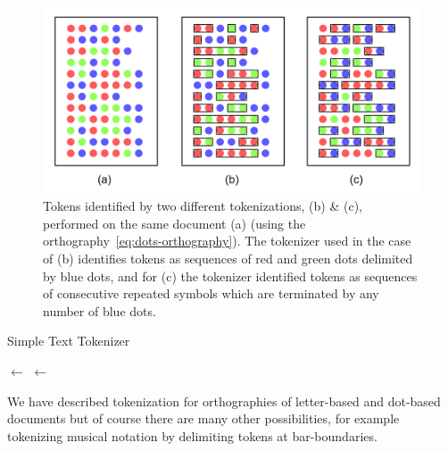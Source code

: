 \begin{figure}[H]
  \centering
  \captionsetup{width=.91\linewidth}
  \includegraphics[scale=0.70]{figures/affinity-designer/tokens.png}
  \caption{Tokens identified by two different tokenizations, (b) \& (c), performed on the same document (a) (using the orthography~\eqref{eq:dots-orthography}). The tokenizer used in the case of (b) identifies tokens as sequences of red and green dots delimited by blue dots, and for (c) the tokenizer identified tokens as sequences of consecutive repeated symbols which are terminated by any number of blue dots.}\label{fig:dot-tokenizers}
\end{figure}
\par
\begin{algorithm}
  {\small
  \caption{Simple Text Tokenizer}\label{alg:simple-tokenizer}
  \SetNoFillComment{}
  \DontPrintSemicolon{}

  \BlankLine

  \Tokens $\leftarrow$ \List{}\;
  \NextToken $\leftarrow$ \List{}\;
  \Return{\Tokens}
  }
\end{algorithm}
\par
We have described tokenization for orthographies of letter-based and dot-based documents but of course there are many other possibilities, for example tokenizing musical notation by delimiting tokens at bar-boundaries.

